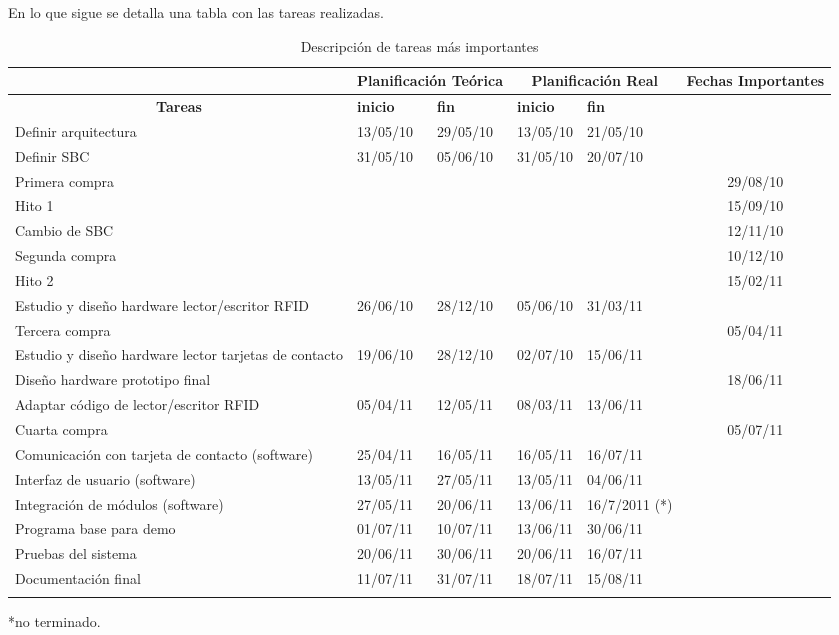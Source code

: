 \bigskip
En lo que sigue se detalla una tabla con las tareas realizadas.


\begin{longtable}{|p{4cm}|p{1.5cm}|p{1.5cm}|p{1.5cm}|p{1.5cm}|c|}
\hline
 & \multicolumn{ 2}{c|}{\textbf{Planificación Teórica}} & \multicolumn{ 2}{c|}{\textbf{Planificación Real}} & \textbf{Fechas Importantes} \\ \hline
\multicolumn{1}{|c|}{\textbf{Tareas}} & \textbf{inicio} & \textbf{fin} & \textbf{inicio} & \textbf{fin} &  \\ \hline
Definir arquitectura & 13/05/10 & 29/05/10 & 13/05/10 & 21/05/10 &  \\ \hline
Definir SBC & 31/05/10 & 05/06/10 & 31/05/10 & 20/07/10 &  \\ \hline
Primera compra &  &  &  &  & 29/08/10 \\ \hline
Hito 1 &  &  &  & \multicolumn{1}{l|}{} & 15/09/10 \\ \hline
Cambio de SBC &  &  &  & \multicolumn{1}{l|}{} & 12/11/10 \\ \hline
Segunda compra &  &  &  & \multicolumn{1}{l|}{} & 10/12/10 \\ \hline
Hito 2 &  &  &  & \multicolumn{1}{l|}{} & 15/02/11 \\ \hline
Estudio y diseño hardware lector/escritor RFID & 26/06/10 & 28/12/10 & 05/06/10 & 31/03/11 &  \\ \hline
Tercera compra &  &  &  &  & 05/04/11 \\ \hline
Estudio y diseño hardware lector tarjetas de contacto & 19/06/10 & 28/12/10 & 02/07/10 & 15/06/11 &  \\ \hline
Diseño hardware prototipo final &  &  &  & \multicolumn{1}{l|}{} & 18/06/11 \\ \hline
Adaptar código de lector/escritor RFID & 05/04/11 & 12/05/11 & 08/03/11 & 13/06/11 &  \\ \hline
Cuarta compra &  &  &  &  & 05/07/11 \\ \hline
Comunicación con tarjeta de contacto (software) & 25/04/11 & 16/05/11 & 16/05/11 & 16/07/11 &  \\ \hline
Interfaz de usuario (software) & 13/05/11 & 27/05/11 & 13/05/11 & 04/06/11 &  \\ \hline
Integración de módulos (software) & 27/05/11 & 20/06/11 & 13/06/11 & 16/7/2011 (*) &  \\ \hline
Programa base para demo & 01/07/11 & 10/07/11 & 13/06/11 & 30/06/11 &  \\ \hline
Pruebas del sistema & 20/06/11 & 30/06/11 & 20/06/11 & 16/07/11 &  \\ \hline
Documentación final & 11/07/11 & 31/07/11 & 18/07/11 & 15/08/11 &  \\ \hline
\caption{Descripción de tareas más importantes}
\label{}
\end{longtable}

*no terminado.